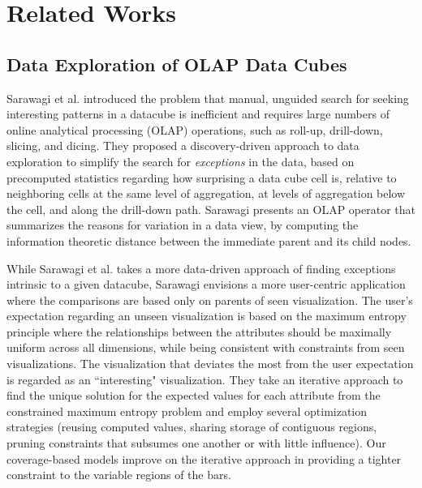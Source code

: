 \section{Related Works}
\subsection{Data Exploration of OLAP Data Cubes}
Sarawagi et al.\cite{Sarawagi1998} introduced the problem that manual, unguided search for seeking interesting patterns in a datacube is inefficient and requires large numbers of online analytical processing (OLAP) operations, such as roll-up, drill-down, slicing, and dicing. They proposed a discovery-driven approach to data exploration to simplify the search for \textit{exceptions} in the data, based on precomputed statistics regarding how surprising a data cube cell is, relative to neighboring cells at the same level of aggregation, at levels of aggregation below the cell, and along the drill-down path. Sarawagi \cite{Sarawagi1999} presents an OLAP operator that summarizes the reasons for variation in a data view, by computing the information theoretic distance between the immediate parent and its child nodes.
\par While Sarawagi et al. \cite{Sarawagi1998} takes a more data-driven approach of finding exceptions intrinsic to a given datacube, Sarawagi \cite{Sarawagi2000} envisions a more user-centric application where the comparisons are based only on parents of seen visualization. The user's expectation regarding an unseen visualization is based on the maximum entropy principle where the relationships between the attributes should be maximally uniform across all dimensions, while being consistent with constraints from seen visualizations. The visualization that deviates the most from the user expectation is regarded as an ``interesting" visualization. They take an iterative approach to find the unique solution for the expected values for each attribute from the constrained maximum entropy problem and employ several optimization strategies (reusing computed values, sharing storage of contiguous regions, pruning constraints that subsumes one another or with little influence). Our coverage-based models improve on the iterative approach in providing a tighter constraint to the variable regions of the bars.
